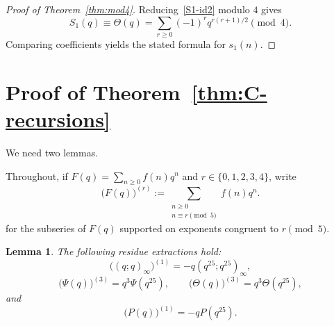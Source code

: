 \documentclass[reqno]{amsart}
\theoremstyle{plain}
\newtheorem{lemma}{Lemma}
\theoremstyle{definition}
\theoremstyle{remark}
\numberwithin{equation}{section}
\begin{document}
\begin{proof}[Proof of Theorem~\ref{thm:mod4}]
Reducing~\eqref{S1-id2} modulo $4$ gives
\[
S_1(q)\equiv \Theta(q)=\sum_{r\ge 0}(-1)^r q^{r(r+1)/2}\pmod{4}.
\]
Comparing coefficients yields the stated formula for $s_1(n)$.
\end{proof}
%
\section{Proof of Theorem~\ref{thm:C-recursions}}\label{sec:proof-C-recursions}
We need two lemmas.

Throughout, if $F(q)=\sum_{n\ge 0} f(n)q^n$ and $r\in\{0,1,2,3,4\}$, write
\[
\bigl(F(q)\bigr)^{(r)}:=\sum_{\substack{n\ge 0\\ n\equiv r\pmod{5}}} f(n)q^n.
\]
for the subseries of $F(q)$ supported on exponents congruent to $r\pmod{5}$.

\begin{lemma}\label{lem:five-parts}
The following residue extractions hold:
\[
\bigl( (q;q)_\infty \bigr)^{(1)}=-q(q^{25};q^{25})_\infty,
\]
\[
\bigl(\Psi(q)\bigr)^{(3)}=q^3\Psi(q^{25}),
\qquad
\bigl(\Theta(q)\bigr)^{(3)}=q^3\Theta(q^{25}),
\]
and
\[
\bigl(P(q) \bigr)^{(1)}=-qP(q^{25}).
\]
\end{lemma}
\end{document}
